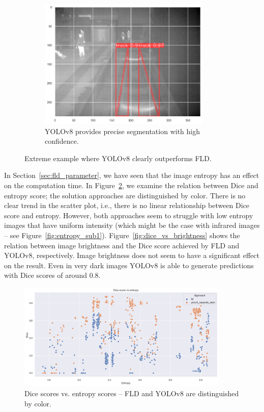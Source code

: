\documentclass[Master,MDS,english]{BASE/twbook} %
\begin{document}
\begin{figure}[H]
\begin{subfigure}[t]{.33\textwidth}
  \includegraphics[width=0.9\textwidth]{images/results/example_4_yolo}
  \caption{YOLOv8 provides precise segmentation with high confidence. }
\end{subfigure}
\caption{Extreme example where YOLOv8 clearly outperforms FLD.}
\label{fig:res_example4}
\end{figure}


In Section~\ref{sec:fld_parameter}, we have seen that the image entropy has an effect on the computation time. In Figure~\ref{fig:dice_vs_entropy}, we examine the relation between Dice and entropy score; the solution approaches are distinguished by color. There is no clear trend in the scatter plot, i.e., there is no linear relationship between Dice score and entropy. However,  both approaches seem to struggle with low entropy images that have uniform intensity  (which might be the case with infrared images -- see Figure~\ref{fig:entropy_sub1}).
Figure~\ref{fig:dice_vs_brightness} shows the relation between image brightness and the Dice score achieved by FLD and YOLOv8, respectively.  Image brightness does not seem to have a significant effect on the result. Even in very dark images YOLOv8 is able to generate predictions with Dice scores of around 0.8. 

\begin{figure}[H]
\centering
\includegraphics[width=0.9\textwidth]{images/results/dice_vs_entropy_nl}
\caption{Dice scores vs. entropy scores -- FLD and YOLOv8 are distinguished by color.  }
\label{fig:dice_vs_entropy}
\end{figure}
\end{document}
